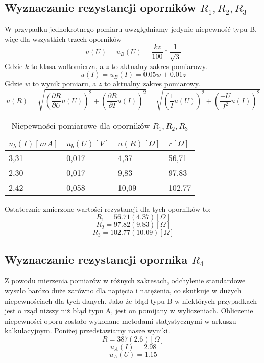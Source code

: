 \documentclass{article}
\begin{document}
\clearpage

\subsection{Wyznaczanie rezystancji oporników $ R_1, R_2, R_3 $}
W przypadku jednokrotnego pomiaru uwzględniamy jedynie niepewność typu B, więc dla wszystkich trzech oporników
$$ u(U) = u_B(U) = \frac{k z}{100} * \frac{1}{\sqrt{3}} $$
Gdzie $k$ to klasa woltomierza, a $z$ to aktualny zakres pomiarowy.
$$ u(I) = u_B(I) = 0.05 w + 0.01 z $$
Gdzie $w$ to wynik pomiaru, a $z$ to aktualny zakres pomiarowy.
$$ u(R) = \sqrt{
    \left(\frac{\partial R}{\partial U}u(U)\right)^2 
    + \left(\frac{\partial R}{\partial I}u(I)\right)^2
} = \sqrt{
    \left(\frac{1}{I}u(U)\right)^2 
    + \left(\frac{-U}{I^2}u(I)\right)^2
} $$

\begin{table}[h!]
\centering
\begin{tabular}{|l|l|l|l|}
\hline
$u_b(I)[mA]$    & $u_b(U)[V]$      & $u(R)[\Omega]$        & $r[\Omega]$           \\ \hline
3,31    & 0,017   & 4,37  & 56,71  \\ \hline
2,30    & 0,017   & 9,83  & 97,83  \\ \hline
2,42    & 0,058   & 10,09 & 102,77 \\ \hline
\end{tabular}
\caption{Niepewności pomiarowe dla oporników $ R_1, R_2, R_3 $ }
\end{table}

Ostatecznie zmierzone wartości rezystancji dla tych oporników to:
$$ R_1 = 56.71(4.37) [\Omega] $$
$$ R_2 = 97.82(9.83) [\Omega] $$
$$ R_3 = 102.77(10.09) [\Omega] $$

\subsection{Wyznaczanie rezystancji opornika $ R_4 $}
Z powodu mierzenia pomiarów w różnych zakresach, odchylenie standardowe wyszło bardzo duże zarówno dla napięcia i natężenia, co skutkuje w dużych niepewnościach dla tych danych. Jako że błąd typu B w niektórych przypadkach jest o rząd niższy niż błąd typu A, jest on pomijany w wyliczeniach.
Obliczenie niepewności oporu zostało wykonane metodami statystycznymi w arkuszu kalkulacyjnym. 
Poniżej przedstawiamy nasze wyniki.
\\
$$ R = 387(2.6) [\Omega] $$
$$ u_A(I) = 2.98 $$
$$ u_A(U) = 1.15 $$
\end{document}
